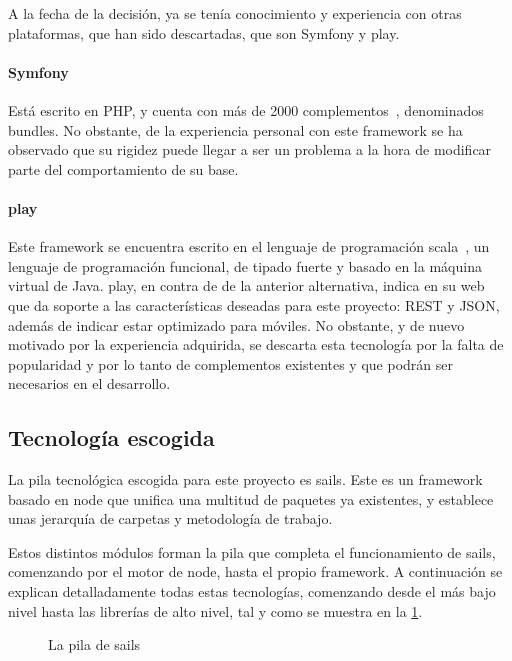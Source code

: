 \documentclass[main]{subfiles}
\begin{document}
A la fecha de la decisión, ya se tenía conocimiento y experiencia con otras plataformas, que han sido descartadas, que son Symfony y \gls{play}.

\paragraph{Symfony}
Está escrito en PHP, y cuenta con más de 2000 complementos~\autocite{knpbundles}, denominados \glspl{bundle}. No obstante, de la experiencia personal con este \gls{framework} se ha observado que su rigidez puede llegar a ser un problema a la hora de modificar parte del comportamiento de su base.

\paragraph{\Gls{play}}
Este \gls{framework} se encuentra escrito en el lenguaje de programación \gls{scala}~\autocite{whatscala}, un lenguaje de programación funcional, de tipado fuerte y basado en la máquina virtual de Java. \Gls{play}, en contra de de la anterior alternativa, indica en su web~\autocite{playframework} que da soporte a las características deseadas para este proyecto: REST y JSON, además de indicar estar optimizado para móviles. No obstante, y de nuevo motivado por la experiencia adquirida, se descarta esta tecnología por la falta de popularidad y por lo tanto de complementos existentes y que podrán ser necesarios en el desarrollo.

\subsection{Tecnología escogida}

La pila tecnológica escogida para este proyecto es \gls{sails}. Este es un \gls{framework} basado en \gls{node} que unifica una multitud de paquetes ya existentes, y establece unas jerarquía de carpetas y metodología de trabajo.

Estos distintos módulos forman la pila que completa el funcionamiento de \gls{sails}, comenzando por el motor de \gls{node}, hasta el propio \gls{framework}\autocite{understandingexpress}. A continuación se explican detalladamente todas estas tecnologías, comenzando desde el más bajo nivel hasta las librerías de alto nivel, tal y como se muestra en la \cref{fig:sails-stack}.

\begin{figure}
  \centering
  \caption[La pila de \gls*{sails}]{La pila de \gls{sails}}
  \label{fig:sails-stack}
\end{figure}
\end{document}
